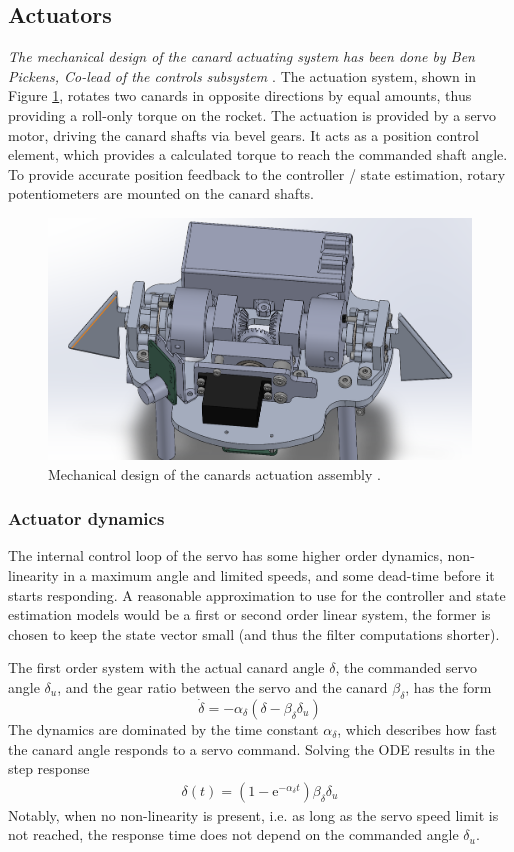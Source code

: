 \subsection{Actuators}
\textit{The mechanical design of the canard actuating system has been done by Ben Pickens, Co-lead of the controls subsystem \cite{team-controls-ben}}.
The actuation system, shown in Figure \ref{fig:model-actuator-cad}, rotates two canards in opposite directions by equal amounts, thus providing a roll-only torque on the rocket.
The actuation is provided by a servo motor, driving the canard shafts via bevel gears.
It acts as a position control element, which provides a calculated torque to reach the commanded shaft angle. 
To provide accurate position feedback to the controller / state estimation, rotary potentiometers are mounted on the canard shafts.
\begin{figure}[ht]
    \centering
    \includegraphics[width=0.6\linewidth]{images-design/actuator_cad.png}
    \caption[Mechanical design of the actuator]{Mechanical design of the canards actuation assembly \cite{team-controls-ben}.}
    \label{fig:model-actuator-cad}
\end{figure}

\subsubsection{Actuator dynamics}
The internal control loop of the servo has some higher order dynamics, non-linearity in a maximum angle and limited speeds, and some dead-time before it starts responding.
A reasonable approximation to use for the controller and state estimation models would be a first or second order linear system, the former is chosen to keep the state vector small (and thus the filter computations shorter).

The first order system with the actual canard angle $\delta$, the commanded servo angle $\delta_u$, and the gear ratio between the servo and the canard $\beta_\delta$, has the form
\begin{equation}
    \dot \delta = -\alpha_\delta (\delta - \beta_\delta\delta_u)
\end{equation}
The dynamics are dominated by the time constant $\alpha_\delta$, which describes how fast the canard angle responds to a servo command. 
Solving the ODE results in the step response
\begin{align}
    \delta(t) = (1-\mathrm{e}^{-\alpha_\delta t}) \beta_\delta \delta_u
\end{align}
Notably, when no non-linearity is present, i.e. as long as the servo speed limit is not reached, the response time does not depend on the commanded angle $\delta_u$.


